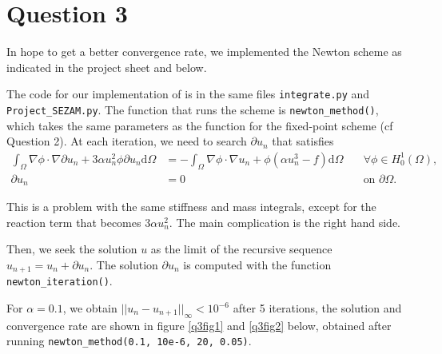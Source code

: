 \documentclass[11pt, a4paper, twoside]{article}
\newcommand{\grad}{\nabla} %
\newcommand{\Hunz}{H^1_0(\Omega)}
\newcommand{\intom}{\int_\Omega}
\renewcommand{\d}{\text{d}}
\begin{document}
\newpage
\section*{Question 3}
In hope to get a better convergence rate, we implemented the Newton scheme as indicated in the project sheet and below.

The code for our implementation of is in the same files \verb+integrate.py+ and \verb+Project_SEZAM.py+. The function that runs the scheme is \verb+newton_method()+, which takes the same parameters as the function for the fixed-point scheme (cf Question 2).
At each iteration, we need to search $\partial u_n$ that satisfies 
\begin{align*}
\intom \grad \phi \cdot \grad \partial u_n + 3\alpha u_n^2 \phi \partial u_n \d\Omega
&= - \intom \grad \phi \cdot \grad u_n + \phi (\alpha u_n^3 - f) \d\Omega \quad
&\forall \phi\in \Hunz,
\\%
\partial u_n &= 0 \quad
&\text{on } \partial\Omega.
\end{align*}

This is a problem with the same stiffness and mass integrals, except for the reaction term that becomes $3\alpha u_n^2$. The main complication is the right hand side.

Then, we seek the solution $u$ as the limit of the recursive sequence $u_{n+1} =u_n + \partial u_n$.
The solution $\partial u_n$ is computed with the function \verb+newton_iteration()+.

For $\alpha = 0.1$, we obtain $||u_n -u_{n+1}||_\infty < 10^{-6}$ after 5 iterations, the solution and convergence rate are shown in figure \ref{q3fig1} and \ref{q3fig2} below, obtained after running \verb+newton_method(0.1, 10e-6, 20, 0.05)+.
\end{document}
